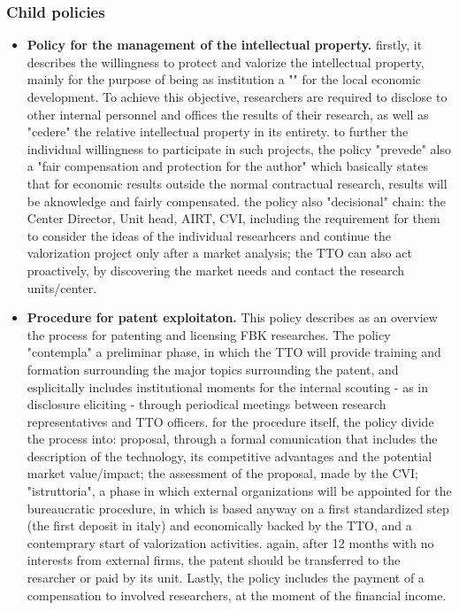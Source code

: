 \subsubsection{Child policies}

\begin{itemize}

\item \textbf{Policy for the management of the intellectual property.} firstly, it describes the willingness to protect and valorize the intellectual property, mainly for the purpose of being as institution a "" for the local economic development. To achieve this objective, researchers are required to disclose to other internal personnel and offices the results of their research, as well as "cedere" the relative intellectual property in its entirety. to further the individual willingness to participate in such projects, the policy "prevede" also a "fair compensation and protection for the author" which basically states that for economic results outside the normal contractual research, results will be aknowledge and fairly compensated. the policy also "decisional" chain: the Center Director, Unit head, AIRT, CVI, including the requirement for them to consider the ideas of the individual researhcers and continue the valorization project only after a market analysis; the TTO can also act proactively, by discovering the market needs and contact the research units/center.

\item \textbf{Procedure for patent exploitaton.} This policy describes as an overview the process for patenting and licensing FBK researches. The policy "contempla" a preliminar phase, in which the TTO will provide training and formation surrounding the major topics surrounding the patent, and esplicitally includes institutional moments for the internal scouting - as in disclosure eliciting - through periodical meetings between research representatives and TTO officers. for the procedure itself, the policy divide the process into: proposal, through a formal comunication that includes the description of the technology, its competitive advantages and the potential market value/impact; the assessment of the proposal, made by the CVI; "istruttoria", a phase in which external organizations will be appointed for the bureaucratic procedure, in which is based anyway on a first standardized step (the first deposit in italy) and economically backed by the TTO, and a contemprary start of valorization activities. again, after 12 months with no interests from external firms, the patent should be transferred to the resarcher or paid by its unit. Lastly, the policy includes the payment of a compensation to involved researchers, at the moment of the financial income.


\end{itemize}
